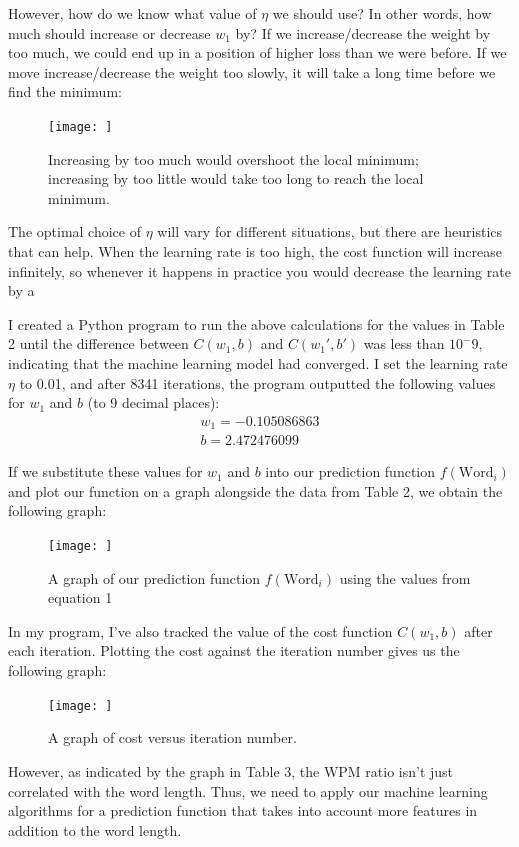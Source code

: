 \documentclass[12pt, demo]{article}
\begin{document}
However, how do we know what value of $\eta$ we should use? In other words, how much should increase or decrease $w_1$ by? If we increase/decrease the weight by too much, we could end up in a position of higher loss than we were before. If we move increase/decrease the weight too slowly, it will take a long time before we find the minimum:

\begin{figure}[H]
	\centering
	\caption{Increasing by too much would overshoot the local minimum; increasing by too little would take too long to reach the local minimum.}
	\texttt{[image: ]}
\end{figure}

The optimal choice of $\eta$ will vary for different situations, but there are heuristics that can help. When the learning rate is too high, the cost function will increase infinitely, so whenever it happens in practice you would decrease the learning rate by a %

I created a Python program to run the above calculations for the values in Table 2 until the difference between $C(w_1, b)$ and $C(w_1', b')$ was less than $10^-9$, indicating that the machine learning model had converged. I set the learning rate $\eta$ to 0.01, and after 8341 iterations, the program outputted the following values for $w_1$ and $b$ (to 9 decimal places):
\begin{align}
	w_1 = -0.105086863 \\
	b = 2.472476099
\end{align}

If we substitute these values for $w_1$ and $b$ into our prediction function $f(\text{Word}_i)$ and plot our function on a graph alongside the data from Table 2, we obtain the following graph:
\begin{figure}[H]
	\centering
	\caption{A graph of our prediction function $f(\text{Word}_i)$ using the values from equation 1}
	\texttt{[image: ]}
\end{figure}

In my program, I've also tracked the value of the cost function $C(w_1, b)$ after each iteration. Plotting the cost against the iteration number gives us the following graph:
\begin{figure}[H]
	\centering
	\caption{A graph of cost versus iteration number.}
	\texttt{[image: ]}
\end{figure}

However, as indicated by the graph in Table 3, the WPM ratio isn't just correlated with the word length. Thus, we need to apply our machine learning algorithms for a prediction function that takes into account more features in addition to the word length.
\end{document}
